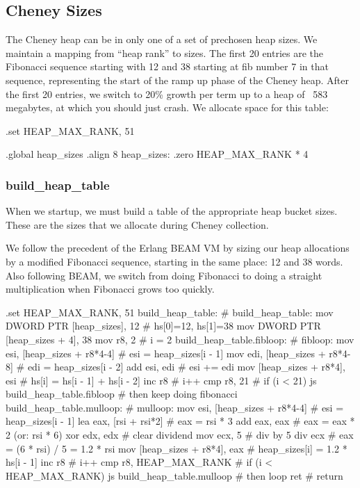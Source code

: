 \subsection{Cheney Sizes}

The Cheney heap can be in only one of a set of prechosen heap sizes. We
maintain a mapping from ``heap rank'' to sizes. The first 20 entries are the
Fibonacci sequence starting with 12 and 38 starting at fib number 7 in that
sequence, representing the start of the ramp up phase of the Cheney heap. After
the first 20 entries, we switch to 20\% growth per term up to a heap of ~583
megabytes, at which you should just crash. We allocate space for this table:

\begin{asmdata}
.set HEAP_MAX_RANK,	51

.global heap_sizes
.align 8
heap_sizes:
	.zero HEAP_MAX_RANK * 4
\end{asmdata}

\subsubsection{build\_heap\_table}

When we startup, we must build a table of the appropriate heap bucket
sizes. These are the sizes that we allocate during Cheney collection.

We follow the precedent of the Erlang BEAM VM by sizing our heap allocations by
a modified Fibonacci sequence, starting in the same place: 12 and 38
words. Also following BEAM, we switch from doing Fibonacci to doing a straight
multiplication when Fibonacci grows too quickly.

\begin{asm}
.set HEAP_MAX_RANK,	51
build_heap_table:			    # build_heap_table:
	mov	DWORD PTR [heap_sizes], 12  #   hs[0]=12, hs[1]=38
	mov	DWORD PTR [heap_sizes + 4], 38
	mov	r8, 2			    #   i = 2
build_heap_table.fibloop:		    # fibloop:
	mov	esi, [heap_sizes + r8*4-4]  #   esi = heap_sizes[i - 1]
	mov	edi, [heap_sizes + r8*4-8]  #   edi = heap_sizes[i - 2]
	add	esi, edi		    #   esi += edi
	mov	[heap_sizes + r8*4], esi    #   hs[i] = hs[i - 1] + hs[i - 2]
	inc	r8			    #   i++
	cmp	r8, 21			    #   if (i < 21)
	js	build_heap_table.fibloop    #   then keep doing fibonacci
build_heap_table.mulloop:		    # mulloop:
	mov	esi, [heap_sizes + r8*4-4]  #   esi = heap_sizes[i - 1]
	lea	eax, [rsi + rsi*2]	    #   eax = rsi * 3
	add	eax, eax		    #   eax = eax * 2 (or: rsi * 6)
	xor	edx, edx		    #   clear dividend
	mov	ecx, 5			    #   div by 5
	div	ecx			    #   eax = (6 * rsi) / 5 = 1.2 * rsi
	mov	[heap_sizes + r8*4], eax    #   heap_sizes[i] = 1.2 * hs[i - 1]
	inc	r8			    #   i++
	cmp	r8, HEAP_MAX_RANK	    #   if (i < HEAP_MAX_RANK)
	js	build_heap_table.mulloop    #   then loop
	ret				    #   return
\end{asm}

